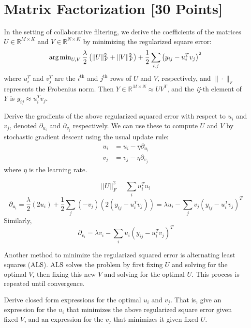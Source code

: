 \newpage
\section{Matrix Factorization [30 Points]}

In the setting of collaborative filtering, we derive the coefficients of the matrices $U \in \mathbb{R}^{M \times K}$ and $V \in \mathbb{R}^{N \times K}$ by minimizing the regularized square error:
$$\operatorname{arg\,min}_{U,V} \frac{\lambda}{2} \left( \|U\|_F^2 + \|V\|^2_F \right) + \frac{1}{2}\sum_{i,j} \left( y_{ij} - u_i^Tv_j\right)^2$$
where $u_i^T$ and $v_j^T$ are the $i^{\text{th}}$ and $j^{\text{th}}$ rows of $U$ and $V$, respectively, and $\|\cdot\|_F$ represents the Frobenius norm. Then $Y \in \mathbb{R}^{M \times N} \approx UV^T$, and the \textit{ij}-th element of $Y$ is $y_{ij} \approx u_i^Tv_j$.

\problem[5]
Derive the gradients of the above regularized squared error with respect to $u_i$ and $v_j$, denoted $\partial_{u_i}$ and $\partial_{v_j}$ respectively.  We can use these to compute $U$ and $V$ by stochastic gradient descent using the usual update rule: 
\begin{align*}
u_i &= u_i - \eta \partial_{u_i} \\
v_j &= v_j - \eta \partial_{v_j}
\end{align*}
where $\eta$ is the learning rate.

\begin{solution}
	\begin{equation}
		||U||^2_F = \sum_i u_i^Tu_i
	\end{equation}
	\begin{equation}
		\partial_{u_i} = \frac{\lambda}{2} (2u_i) +  \frac{1}{2} \sum_j(-v_j)(2(y_{ij}-u_i^Tv_j)) = \lambda u_i - \sum_j v_j (y_{ij} - u_i^Tv_j)^T
	\end{equation}
	Similarly,
	\begin{equation}
		\partial_{v_i} = \lambda v_i - \sum_i u_i (y_{ij} - u_i^Tv_j)^T
	\end{equation}
\end{solution}

\problem[5]
Another method to minimize the regularized squared error is alternating least squares (ALS). ALS solves the problem by first fixing $U$ and solving for the optimal $V$, then fixing this new $V$ and solving for the optimal $U$.  This process is repeated until convergence.

Derive closed form expressions for the optimal $u_i$ and $v_j$.  That is, give an expression for the $u_i$ that minimizes the above regularized square error given fixed $V$, and an expression for the $v_j$ that minimizes it given fixed $U$.

